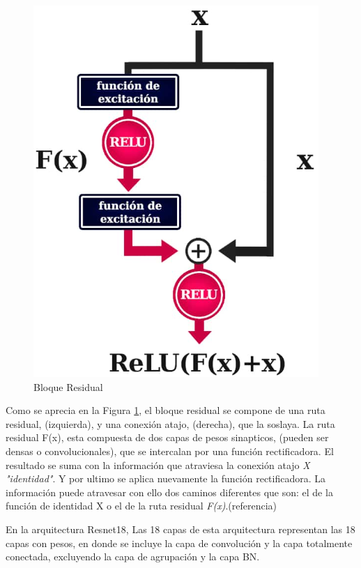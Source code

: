 				\begin{figure}[ht]
					\centering
					\includegraphics[scale=0.6]{Figs/67.png}
					\caption{Bloque Residual}
					\label{fig:Bloque}
				\end{figure}
			
				Como se aprecia en la Figura \ref{fig:Bloque}, el bloque residual se compone de una ruta residual, (izquierda), y una conexión atajo, (derecha), que la soslaya. La ruta residual F(x), esta compuesta de dos capas de pesos sinapticos, (pueden ser densas o convolucionales), que se intercalan por una función rectificadora. El resultado se suma con la información que atraviesa la conexión atajo \textit{X "identidad"}. Y por ultimo se aplica nuevamente la función rectificadora. La información puede atravesar con ello dos caminos diferentes que son: el de la función de identidad X o el de la ruta residual \textit{F(x)}.(referencia)

\newpage

				En la arquitectura Resnet18, Las 18 capas de esta arquitectura representan las 18 capas con pesos, en donde se incluye la capa de convolución y la capa totalmente conectada, excluyendo la capa de agrupación y la capa BN.
				
